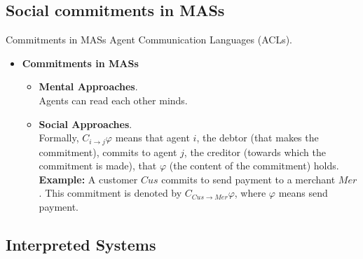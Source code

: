 \documentclass{beamer}
\begin{document}
\subsection{Social commitments in MASs}
    \begin{frame}{Commitments in MASs}
        Agent Communication Languages (ACLs).
        \begin{itemize}
            \itemsep=.35cm
        	\item \textbf{Commitments in MASs}
            \begin{itemize}
              \item \textbf{Mental Approaches}. \\Agents can read each other minds.
              \item \textbf{Social Approaches}. \\
              Formally, $C_{i\rightarrow j}\varphi$ means that agent $i$, the debtor (that makes the commitment), commits to agent $j$, the creditor (towards which the commitment is made), that $\varphi$ (the content of the commitment) holds. \\
              \textbf{Example:}  A customer $Cus$ commits to send payment to a merchant $Mer$. This commitment is denoted by $C_{Cus \rightarrow Mer} \varphi$, where $\varphi$ means send payment.

            \end{itemize}
                      	      	
        \end{itemize}



\end{frame}

\subsection{Interpreted Systems}
\end{document}

